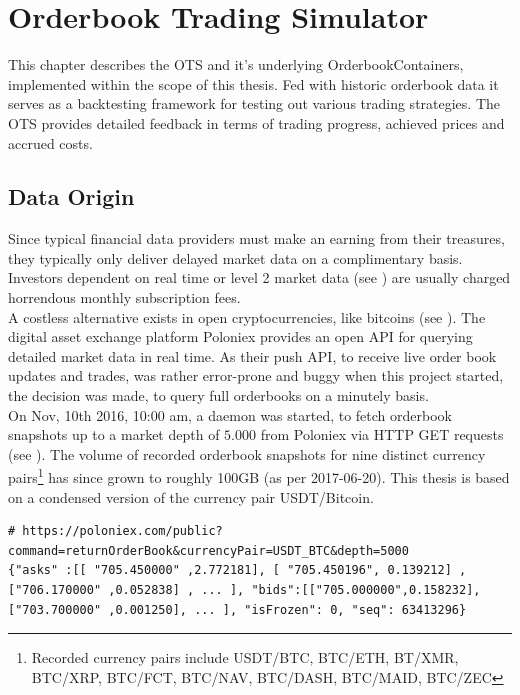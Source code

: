 \chapter{Orderbook Trading Simulator}
\label{chap:simulator}
This chapter describes the \ac{OTS} and it's underlying OrderbookContainers, implemented within the scope of this thesis. Fed with historic orderbook data it serves as a backtesting framework for testing out various trading strategies. The \ac{OTS} provides detailed feedback in terms of trading progress, achieved prices and accrued costs.

\section{Data Origin}
\label{chap:dataorigin}
Since typical financial data providers must make an earning from their treasures, they typically only deliver delayed market data on a complimentary basis. Investors dependent on real time or level 2 market data (see ) are usually charged horrendous monthly subscription fees.\\

A costless alternative exists in open cryptocurrencies, like bitcoins (see ). The digital asset exchange platform Poloniex \cite{poloniex} provides an open API for querying detailed market data in real time. As their push API, to receive live order book updates and trades, was rather error-prone and buggy when this project started, the decision was made, to query full orderbooks on a minutely basis.\\

On Nov, 10th 2016, 10:00 am, a daemon was started, to fetch orderbook snapshots up to a market depth of $5.000$ from Poloniex via HTTP GET requests (see ). The volume of recorded orderbook snapshots for nine distinct currency pairs\footnote{Recorded currency pairs include USDT/BTC, BTC/ETH, BT/XMR, BTC/XRP, BTC/FCT, BTC/NAV, BTC/DASH, BTC/MAID, BTC/ZEC} has since grown to roughly 100GB (as per 2017-06-20). This thesis is based on a condensed version of the currency pair USDT/Bitcoin.

\begin{lstlisting}[frame=single, breaklines=true, basicstyle=\scriptsize, caption=Data fetched from Poloniex via HTTP GET request, label=lst:PoloniexFetch]
# https://poloniex.com/public?command=returnOrderBook&currencyPair=USDT_BTC&depth=5000
{"asks" :[[ "705.450000" ,2.772181], [ "705.450196", 0.139212] ,["706.170000" ,0.052838] , ... ], "bids":[["705.000000",0.158232],["703.700000" ,0.001250], ... ], "isFrozen": 0, "seq": 63413296}
\end{lstlisting}

